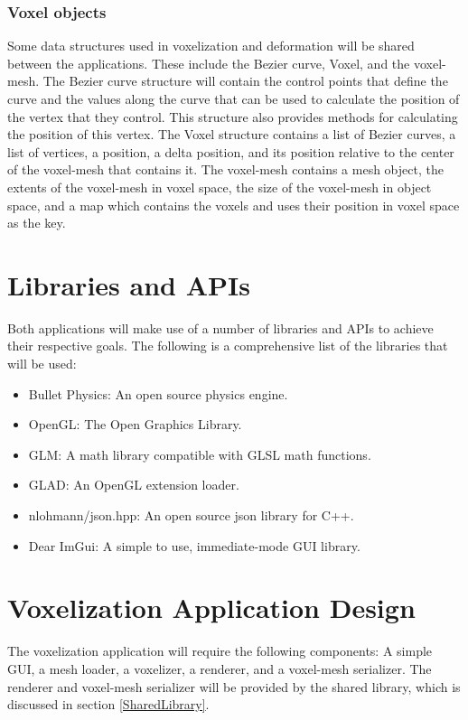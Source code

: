 \subsubsection{Voxel objects} \label{VoxelObjects}

Some data structures used in voxelization and deformation will be shared between the applications.
These include the Bezier curve, Voxel, and the voxel-mesh. The Bezier curve structure will contain
the control points that define the curve and the values along the curve that can be used to 
calculate the position of the vertex that they control. This structure also provides methods for
calculating the position of this vertex. The Voxel structure contains a list of Bezier curves, a 
list of vertices, a position, a delta position, and its position relative to the center of the 
voxel-mesh that contains it. The voxel-mesh contains a mesh object, the extents of the voxel-mesh 
in voxel space, the size of the voxel-mesh in object space, and a map which contains the voxels and
uses their position in voxel space as the key.

\section{Libraries and APIs}

Both applications will make use of a number of libraries and APIs to achieve their respective goals. 
The following is a comprehensive list of the libraries that will be used:

\begin{itemize}
  \item Bullet Physics: An open source physics engine.
  \item OpenGL: The Open Graphics Library.
  \item GLM: A math library compatible with GLSL math functions.
  \item GLAD: An OpenGL extension loader.
  \item nlohmann/json.hpp: An open source json library for C++.
  \item Dear ImGui: A simple to use, immediate-mode GUI library.
\end{itemize}

\section{Voxelization Application Design}

The voxelization application will require the following components: A simple GUI, a mesh loader,
a voxelizer, a renderer, and a voxel-mesh serializer. The renderer and voxel-mesh serializer will 
be provided by the shared library, which is discussed in section \ref{SharedLibrary}. 

